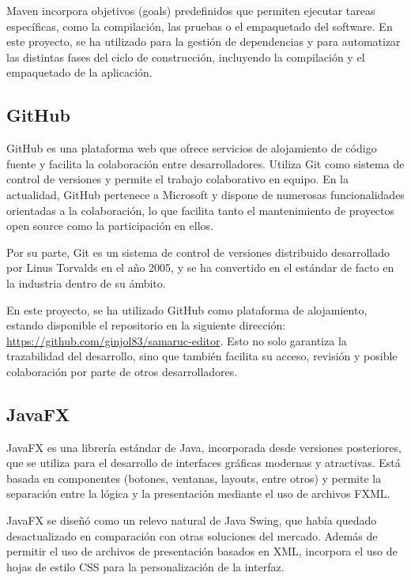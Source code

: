 \documentclass[../../main.tex]{subfiles}
\begin{document}
Maven incorpora objetivos (goals) predefinidos que permiten ejecutar tareas específicas, como la compilación, las pruebas o el empaquetado del software. En este proyecto, se ha utilizado para la gestión de dependencias y para automatizar las distintas fases del ciclo de construcción, incluyendo la compilación y el empaquetado de la aplicación.

\subsection{GitHub}

GitHub es una plataforma web que ofrece servicios de alojamiento de código fuente y facilita la colaboración entre desarrolladores. Utiliza Git como sistema de control de versiones y permite el trabajo colaborativo en equipo. En la actualidad, GitHub pertenece a Microsoft y dispone de numerosas funcionalidades orientadas a la colaboración, lo que facilita tanto el mantenimiento de proyectos open source como la participación en ellos.

Por su parte, Git es un sistema de control de versiones distribuido desarrollado por Linus Torvalds en el año 2005, y se ha convertido en el estándar de facto en la industria dentro de su ámbito.

En este proyecto, se ha utilizado GitHub como plataforma de alojamiento, estando disponible el repositorio en la siguiente dirección: \url{https://github.com/ginjol83/samaruc-editor}. Esto no solo garantiza la trazabilidad del desarrollo, sino que también facilita su acceso, revisión y posible colaboración por parte de otros desarrolladores.

\subsection{JavaFX}

JavaFX es una librería estándar de Java, incorporada desde versiones posteriores, que se utiliza para el desarrollo de interfaces gráficas modernas y atractivas. Está basada en componentes (botones, ventanas, layouts, entre otros) y permite la separación entre la lógica y la presentación mediante el uso de archivos FXML.

JavaFX se diseñó como un relevo natural de Java Swing, que había quedado desactualizado en comparación con otras soluciones del mercado. Además de permitir el uso de archivos de presentación basados en XML, incorpora el uso de hojas de estilo CSS para la personalización de la interfaz.
\end{document}
